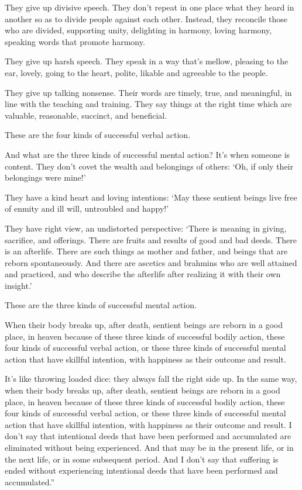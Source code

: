 \documentclass[12pt,openany]{book}%
\begin{document}
They give up divisive speech. They don’t repeat in one place what they heard in another so as to divide people against each other. Instead, they reconcile those who are divided, supporting unity, delighting in harmony, loving harmony, speaking words that promote harmony. 

They give up harsh speech. They speak in a way that’s mellow, pleasing to the ear, lovely, going to the heart, polite, likable and agreeable to the people. 

They give up talking nonsense. Their words are timely, true, and meaningful, in line with the teaching and training. They say things at the right time which are valuable, reasonable, succinct, and beneficial. 

These are the four kinds of successful verbal action. 

And what are the three kinds of successful mental action? It’s when someone is content. They don’t covet the wealth and belongings of others: ‘Oh, if only their belongings were mine!’ 

They have a kind heart and loving intentions: ‘May these sentient beings live free of enmity and ill will, untroubled and happy!’ 

They have right view, an undistorted perspective: ‘There is meaning in giving, sacrifice, and offerings. There are fruits and results of good and bad deeds. There is an afterlife. There are such things as mother and father, and beings that are reborn spontaneously. And there are ascetics and brahmins who are well attained and practiced, and who describe the afterlife after realizing it with their own insight.’ 

These are the three kinds of successful mental action. 

When their body breaks up, after death, sentient beings are reborn in a good place, in heaven because of these three kinds of successful bodily action, these four kinds of successful verbal action, or these three kinds of successful mental action that have skillful intention, with happiness as their outcome and result. 

It’s like throwing loaded dice: they always fall the right side up. In the same way, when their body breaks up, after death, sentient beings are reborn in a good place, in heaven because of these three kinds of successful bodily action, these four kinds of successful verbal action, or these three kinds of successful mental action that have skillful intention, with happiness as their outcome and result. I don’t say that intentional deeds that have been performed and accumulated are eliminated without being experienced. And that may be in the present life, or in the next life, or in some subsequent period. And I don’t say that suffering is ended without experiencing intentional deeds that have been performed and accumulated.” 
\end{document}
